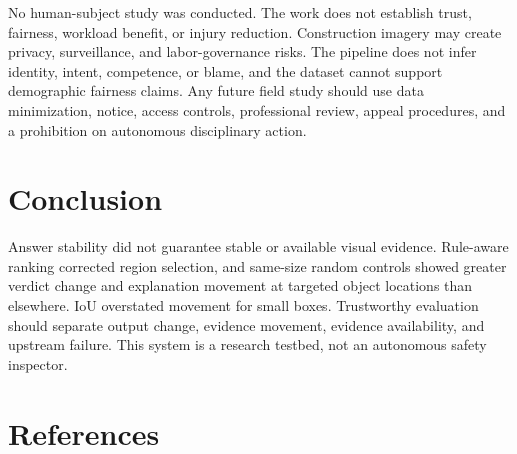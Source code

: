 \documentclass[12pt,letterpaper,twoside]{article}
\begin{document}
No human-subject study was conducted. The work does not establish trust, fairness, workload benefit, or injury reduction. Construction imagery may create privacy, surveillance, and labor-governance risks. The pipeline does not infer identity, intent, competence, or blame, and the dataset cannot support demographic fairness claims. Any future field study should use data minimization, notice, access controls, professional review, appeal procedures, and a prohibition on autonomous disciplinary action.

\section{Conclusion}

Answer stability did not guarantee stable or available visual evidence. Rule-aware ranking corrected region selection, and same-size random controls showed greater verdict change and explanation movement at targeted object locations than elsewhere. IoU overstated movement for small boxes. Trustworthy evaluation should separate output change, evidence movement, evidence availability, and upstream failure. This system is a research testbed, not an autonomous safety inspector.

\label{bodyend}
\clearpage
\section*{References}
\end{document}
